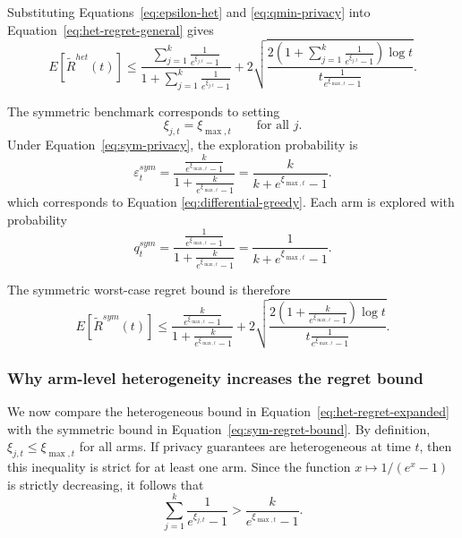 \documentclass[mksc,nonblindrev]{informs3}
\begin{document}
\begin{APPENDICES}
Substituting Equations~\eqref{eq:epsilon-het} and \eqref{eq:qmin-privacy} into Equation~\eqref{eq:het-regret-general} gives
\begin{equation}
\label{eq:het-regret-expanded}
E[\tilde R^{het}(t)]
\leq
\frac{
\sum_{j=1}^k \frac{1}{e^{\xi_{j,t}}-1}
}{
1+\sum_{j=1}^k \frac{1}{e^{\xi_{j,t}}-1}
}
+
2\sqrt{
\frac{
2\left(1+\sum_{j=1}^k \frac{1}{e^{\xi_{j,t}}-1}\right)\log t
}{
t\frac{1}{e^{\xi_{\max,t}}-1}
}
}.
\end{equation}

The symmetric benchmark corresponds to setting
\begin{equation}
\label{eq:sym-privacy}
\xi_{j,t}
=
\xi_{\max,t}
\qquad \text{for all } j.
\end{equation}
Under Equation~\eqref{eq:sym-privacy}, the exploration probability is
\begin{equation}
\label{eq:epsilon-sym}
\varepsilon_t^{sym}
=
\frac{
\frac{k}{e^{\xi_{\max,t}}-1}
}{
1+\frac{k}{e^{\xi_{\max,t}}-1}
}
=
\frac{k}{k+e^{\xi_{\max,t}}-1}.
\end{equation}
which corresponds to Equation \eqref{eq:differential-greedy}. Each arm is explored with probability
\begin{equation}
\label{eq:q-sym}
q_t^{sym}
=
\frac{
\frac{1}{e^{\xi_{\max,t}}-1}
}{
1+\frac{k}{e^{\xi_{\max,t}}-1}
}
=
\frac{1}{k+e^{\xi_{\max,t}}-1}.
\end{equation}

The symmetric worst-case regret bound is therefore
\begin{equation}
\label{eq:sym-regret-bound}
E[\tilde R^{sym}(t)]
\leq
\frac{
\frac{k}{e^{\xi_{\max,t}}-1}
}{
1+\frac{k}{e^{\xi_{\max,t}}-1}
}
+
2\sqrt{
\frac{
2\left(1+\frac{k}{e^{\xi_{\max,t}}-1}\right)\log t
}{
t\frac{1}{e^{\xi_{\max,t}}-1}
}
}.
\end{equation}


\subsubsection{Why arm-level heterogeneity increases the regret bound}
We now compare the heterogeneous bound in Equation~\eqref{eq:het-regret-expanded} with the symmetric bound in Equation~\eqref{eq:sym-regret-bound}. By definition, $\xi_{j,t}\leq \xi_{\max,t}$ for all arms. If privacy guarantees are heterogeneous at time $t$, then this inequality is strict for at least one arm. Since the function $x\mapsto 1/(e^x-1)$ is strictly decreasing, it follows that
\begin{equation}
\label{eq:sum-privacy-ineq}
\sum_{j=1}^k
\frac{1}{e^{\xi_{j,t}}-1}
>
\frac{k}{e^{\xi_{\max,t}}-1}.
\end{equation}


\end{APPENDICES}
\end{document}
